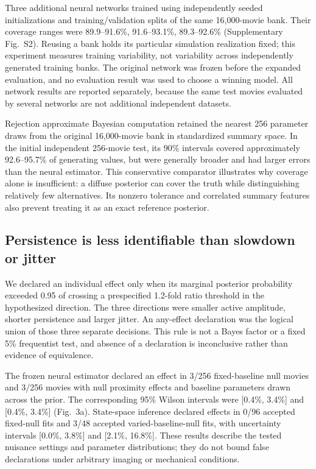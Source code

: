 \documentclass[12pt]{article}
\begin{document}
Three additional neural networks trained using independently seeded initializations and training/validation splits of the same 16,000-movie bank. Their coverage ranges were 89.9--91.6\%, 91.6--93.1\%, 89.3--92.6\% (Supplementary Fig.~S2). Reusing a bank holds its particular simulation realization fixed; this experiment measures training variability, not variability across independently generated training banks. The original network was frozen before the expanded evaluation, and no evaluation result was used to choose a winning model. All network results are reported separately, because the same test movies evaluated by several networks are not additional independent datasets.

Rejection approximate Bayesian computation retained the nearest 256 parameter draws from the original 16,000-movie bank in standardized summary space. In the initial independent 256-movie test, its 90\% intervals covered approximately 92.6--95.7\% of generating values, but were generally broader and had larger errors than the neural estimator. This conservative comparator illustrates why coverage alone is insufficient: a diffuse posterior can cover the truth while distinguishing relatively few alternatives. Its nonzero tolerance and correlated summary features also prevent treating it as an exact reference posterior.

\subsection*{Persistence is less identifiable than slowdown or jitter}
We declared an individual effect only when its marginal posterior probability exceeded 0.95 of crossing a prespecified 1.2-fold ratio threshold in the hypothesized direction. The three directions were smaller active amplitude, shorter persistence and larger jitter. An any-effect declaration was the logical union of those three separate decisions. This rule is not a Bayes factor or a fixed 5\% frequentist test, and absence of a declaration is inconclusive rather than evidence of equivalence.

The frozen neural estimator declared an effect in 3/256 fixed-baseline null movies and 3/256 movies with null proximity effects and baseline parameters drawn across the prior. The corresponding 95\% Wilson intervals were [0.4\%, 3.4\%] and [0.4\%, 3.4\%] (Fig.~3a). State-space inference declared effects in 0/96 accepted fixed-null fits and 3/48 accepted varied-baseline-null fits, with uncertainty intervals [0.0\%, 3.8\%] and [2.1\%, 16.8\%]. These results describe the tested nuisance settings and parameter distributions; they do not bound false declarations under arbitrary imaging or mechanical conditions.
\end{document}
